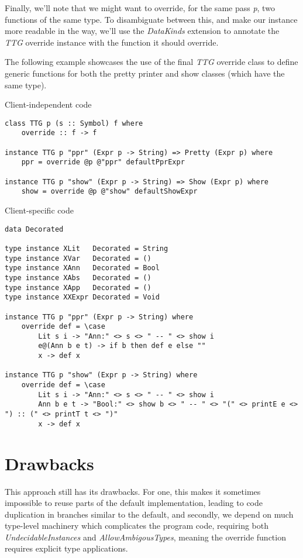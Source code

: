 \documentclass{article}
\begin{document}
Finally, we'll note that we might want to override, for the same pass \emph{p},
two functions of the same type. To disambiguate between this, and make our
instance more readable in the way, we'll use the \emph{DataKinds} extension to
annotate the \emph{TTG} override instance with the function it should override.

The following example showcases the use of the final \emph{TTG} override class
to define generic functions for both the pretty printer and show classes (which
have the same type).

Client-independent code
\begin{lstlisting}
class TTG p (s :: Symbol) f where
    override :: f -> f

instance TTG p "ppr" (Expr p -> String) => Pretty (Expr p) where
    ppr = override @p @"ppr" defaultPprExpr

instance TTG p "show" (Expr p -> String) => Show (Expr p) where
    show = override @p @"show" defaultShowExpr
\end{lstlisting}

Client-specific code
\begin{lstlisting}
data Decorated

type instance XLit   Decorated = String
type instance XVar   Decorated = ()
type instance XAnn   Decorated = Bool
type instance XAbs   Decorated = ()
type instance XApp   Decorated = ()
type instance XXExpr Decorated = Void

instance TTG p "ppr" (Expr p -> String) where
    override def = \case
        Lit s i -> "Ann:" <> s <> " -- " <> show i
        e@(Ann b e t) -> if b then def e else ""
        x -> def x

instance TTG p "show" (Expr p -> String) where
    override def = \case
        Lit s i -> "Ann:" <> s <> " -- " <> show i
        Ann b e t -> "Bool:" <> show b <> " -- " <> "(" <> printE e <> ") :: (" <> printT t <> ")"
        x -> def x
\end{lstlisting}

\section{Drawbacks}

This approach still has its drawbacks. For one, this makes it sometimes
impossible to reuse parts of the default implementation, leading to code
duplication in branches similar to the default, and secondly, we depend on much
type-level machinery which complicates the program code, requiring both
\emph{UndecidableInstances} and \emph{AllowAmbigousTypes}, meaning the override
function requires explicit type applications.

\end{document}

